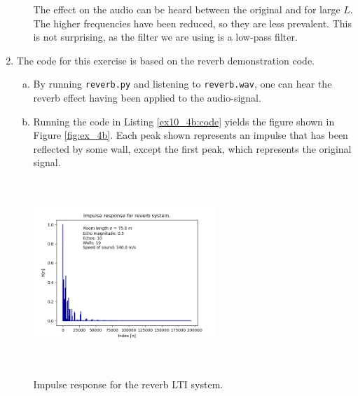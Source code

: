 \begin{enumerate}
\begin{enumerate}[a)]
                The effect on the audio can be heard between the original and for large $L$. 
                The higher frequencies have been reduced, so they are less prevalent. 
                This is not surprising, as the filter we are using is a low-pass filter. 

        \end{enumerate}

  \item The code for this exercise is based on the reverb demonstration code. 
        \begin{enumerate}[a)]
          \item By running \verb|reverb.py| and listening to \verb|reverb.wav|, one can
                hear the reverb effect having been applied to the audio-signal.

          \item Running the code in Listing \ref{ex10_4b:code} yields the figure shown in Figure \ref{fig:ex_4b}.
                Each peak shown represents an impulse that has been reflected by some wall, except the first
                peak, which represents the original signal.
                \begin{marginfigure}
                  \includegraphics[width=6.9cm, height=7.0cm]{ch10/figures/ex10_4b.png}
                  \caption{Impulse response for the reverb LTI system.}
                  \label{fig:ex_4b}
                \end{marginfigure}

                


\end{enumerate}
\end{enumerate}

